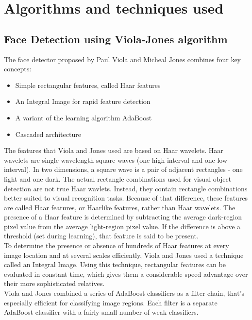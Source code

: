 \documentclass[%
        submission,
        notitlepage,
        narroweqnarray,
        inline,
        ]{ieee}
\begin{document}
\section{Algorithms and techniques used}

\subsection{Face Detection using Viola-Jones algorithm}
The face detector proposed by Paul Viola and Micheal Jones\cite{Viola01} combines four key concepts\cite{servo}:
\begin{itemize}
	\item Simple rectangular features, called Haar features
	\item An Integral Image for rapid feature detection
	\item A variant of the learning algorithm AdaBoost
	\item Cascaded architecture
\end{itemize}
The features that Viola and Jones used are based on Haar wavelets.
Haar wavelets are single wavelength square waves (one high interval and one low interval).
In two dimensions, a square wave is a pair of adjacent rectangles - one light and one dark.
The actual rectangle combinations used for visual object detection are not true Haar wavlets.
Instead, they contain rectangle combinations better suited to visual recognition tasks.
Because of that difference, these features are called Haar features, or Haarlike features, rather than Haar wavelets.
The presence of a Haar feature is determined by subtracting the average dark-region pixel value from the average light-region pixel value.
If the difference is above a threshold (set during learning), that feature is said to be present.\\
To determine the presence or absence of hundreds of Haar features at every image location and at several scales efficiently, Viola and Jones used a technique called an Integral Image.
Using this technique, rectangular features can be evaluated in constant time, which gives them a considerable speed advantage over their more sophisticated relatives.\\
Viola and Jones combined a series of AdaBoost classifiers as a filter chain, that's especially efficient for classifying image regions.
Each filter is a separate AdaBoost classifier with a fairly small number of weak classifiers.
\end{document}
